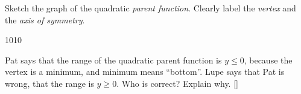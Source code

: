 %
%
\myProblemsWithContent
{
    Sketch the graph of the quadratic {\itshape parent function}.
    Clearly label the {\itshape vertex} and the {\itshape axis of symmetry}.\\[1\baselineskip]
    \begin{myTikzpictureGrid}{0.2} {10}{10}
    \end{myTikzpictureGrid}
}
{
    Pat says that the range of the quadratic parent function 
    is $y\le 0$, because the vertex is a minimum, and minimum means 
    ``bottom''.
    Lupe says that Pat is wrong, that the range is 
    $y\ge 0$. 
    Who is correct? Explain why.
}[\normalsize]
